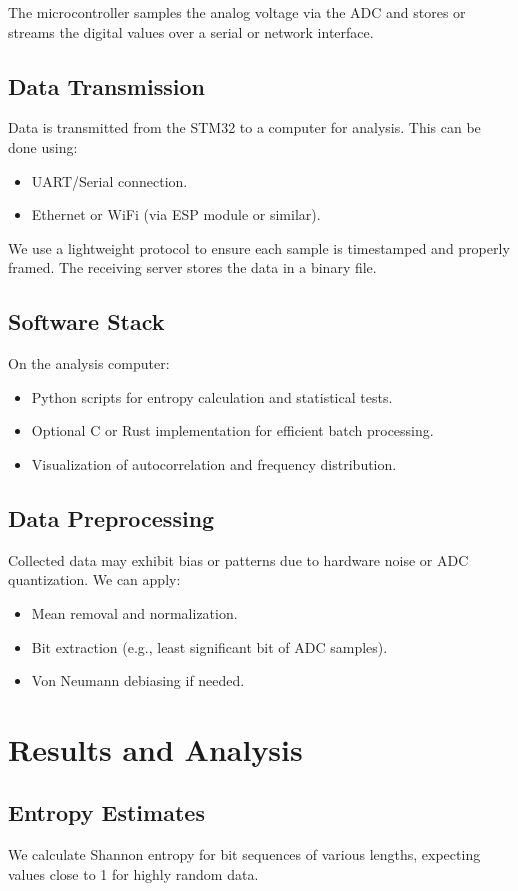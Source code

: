 The microcontroller samples the analog voltage via the ADC and 
stores or 
streams the digital values over a serial or network interface.

\subsection{Data Transmission}
Data is transmitted from the STM32 to a computer for analysis. 
This can be done using:
\begin{itemize}
    \item UART/Serial connection.
    \item Ethernet or WiFi (via ESP module or similar).
\end{itemize}

We use a lightweight protocol to ensure each sample is timestamped 
and properly framed. The receiving server stores the data in a 
binary file.

\subsection{Software Stack}
On the analysis computer:
\begin{itemize}
    \item Python scripts for entropy calculation and statistical tests.
    \item Optional C or Rust implementation for efficient batch 
        processing.
    \item Visualization of autocorrelation and frequency distribution.
\end{itemize}

\subsection{Data Preprocessing}
Collected data may exhibit bias or patterns due to hardware noise or 
ADC quantization. We can apply:
\begin{itemize}
    \item Mean removal and normalization.
    \item Bit extraction (e.g., least significant bit of ADC samples).
    \item Von Neumann debiasing if needed.
\end{itemize}

\newpage
\section{Results and Analysis}
\subsection{Entropy Estimates}
We calculate Shannon entropy for bit sequences of various lengths, 
expecting values close to 1 for highly random data.

